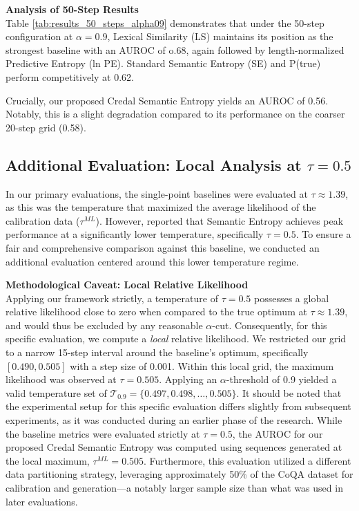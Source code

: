 \textbf{Analysis of 50-Step Results} \\
Table \ref{tab:results_50_steps_alpha09} demonstrates that under the 50-step
configuration at $\alpha=0.9$, Lexical Similarity (LS)
maintains its position as the strongest baseline with an AUROC of o.68,
again followed by length-normalized Predictive Entropy (ln PE).
Standard Semantic Entropy (SE) and P(true) perform competitively at 0.62.

Crucially, our proposed Credal Semantic Entropy yields an AUROC of 0.56. 
Notably, this is a slight degradation compared to its performance on the 
coarser 20-step grid (0.58).


\subsection{Additional Evaluation: Local Analysis at $\tau=0.5$}
\label{sec:experiments:results:additional}
In our primary evaluations, the single-point baselines were evaluated at
$\tau \approx 1.39$, as this was the temperature that maximized the average 
likelihood of the calibration data ($\tau^{ML}$). However, 
\textcite{kuhn2023semanticuncertaintylinguisticinvariances} reported that
Semantic Entropy achieves peak performance at a significantly lower
temperature, specifically $\tau=0.5$.
To ensure a fair and comprehensive comparison against this baseline, we 
conducted an additional evaluation centered around this lower temperature
regime.

\textbf{Methodological Caveat: Local Relative Likelihood} \\
Applying our framework strictly, a temperature of $\tau=0.5$ possesses a 
global relative likelihood close to zero when compared to the true optimum
at $\tau \approx 1.39$, and would thus be excluded by any reasonable 
$\alpha$-cut. Consequently, for this specific evaluation, we compute a
\textit{local} relative likelihood. We restricted our grid to a narrow
15-step interval around the baseline's optimum, specifically 
$[0.490, 0.505]$ with a step size of 0.001. Within this local grid, the
maximum likelihood was observed at $\tau=0.505$. Applying an 
$\alpha$-threshold of 0.9 yielded a valid temperature set of 
$\mathcal{T}_{0.9} = \{0.497, 0.498, \dots, 0.505\}$.
It should be noted that the experimental setup for this specific
evaluation differs slightly from subsequent experiments, as it
was conducted during an earlier phase of the research. While the 
baseline metrics were evaluated strictly at $\tau=0.5$, the AUROC
for our proposed Credal Semantic Entropy was computed using 
sequences generated at the local maximum, $\tau^{ML}=0.505$. 
Furthermore, this evaluation utilized a different data 
partitioning strategy, leveraging approximately 50\% of the CoQA 
dataset for calibration and generation---a notably larger 
sample size than what was used in later evaluations.


